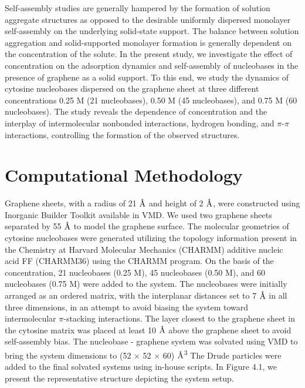Self-assembly studies are generally hampered by the formation of solution aggregate structures as opposed to the desirable uniformly dispersed monolayer self-assembly on the underlying solid-state support.\supercite{lotito_approaches_2017} The balance between solution aggregation and solid-supported monolayer formation is generally dependent on the concentration of the solute. In the present study, we investigate the effect of concentration on the adsorption dynamics and self-assembly of nucleobases in the presence of graphene as a solid support. To this end, we study the dynamics of cytosine nucleobases dispersed on the graphene sheet at three different concentrations 0.25 M (21 nucleobases), 0.50 M (45 nucleobases), and 0.75 M (60 nucleobases). The study reveals the dependence of concentration and the interplay of intermolecular nonbonded interactions, hydrogen bonding, and $\pi$-$\pi$ interactions, controlling the formation of the observed structures.

\section{Computational Methodology}
Graphene sheets, with a radius of 21 $\text{\normalfont\AA}$ and height of 2 $\text{\normalfont\AA}$, were constructed using Inorganic Builder Toolkit available in VMD.\supercite{humphrey_vmd_1996} We used two graphene sheets separated by 55 $\text{\normalfont\AA}$ to model the graphene surface. The molecular geometries of cytosine nucleobases were generated utilizing the topology information present in the Chemistry at Harvard Molecular Mechanics (CHARMM) additive nucleic acid FF\supercite{hart_optimization_2012, foloppe_all-atom_2000, mackerell_all-atom_2000} (CHARMM36) using the CHARMM program.\supercite{brooks_charmm_1983, brooks_charmm_2009} On the basis of the concentration, 21 nucleobases (0.25 M), 45 nucleobases (0.50 M), and 60 nucleobases (0.75 M) were added to the system. The nucleobases were initially arranged as an ordered matrix, with the interplanar distances set to 7 $\text{\normalfont\AA}$ in all three dimensions, in an attempt to avoid biasing the system toward intermolecular $\pi$-stacking interactions. The layer closest to the graphene sheet in the cytosine matrix was placed at least 10 $\text{\normalfont\AA}$ above the graphene sheet to avoid self-assembly bias. The nucleobase - graphene system was solvated using VMD to bring the system dimensions to (52 × 52 × 60) $\text{\normalfont\AA}$\textsuperscript{3} The Drude particles were added to the final solvated systems using in-house scripts. In Figure 4.1, we present the representative structure depicting the system setup.

